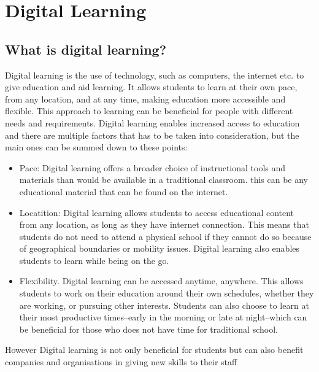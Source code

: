 \section{Digital Learning}\label{ch:digital_learning_ch}
\subsection{What is digital learning?}\label{ch:what_is_digital_learning}

Digital learning is the use of technology, such as computers, the internet etc. to give education and aid learning. It allows students to learn at their own pace, from any location, and at any time, making education more accessible and flexible. 
This approach to learning can be beneficial for people with different needs and requirements. Digital learning enables increased access to education and there are multiple factors that has to be taken into consideration, but the main ones can be summed down to these points\cite*{What_Is_Digital_Learning}:
\begin{itemize}
  \item   Pace:
	Digital learning offers a broader choice of instructional tools and materials than would be available in a traditional classroom. this can be any educational material that can be found on the internet.\cite*{What_Is_Digital_Learning}
  \item Locatition:
	  Digital learning allows students to access educational content from any location, as long as they have internet connection. This means that students do not need to attend a physical school if they cannot do so because of geographical boundaries or mobility issues. Digital learning also enables students to learn while being on the go.\cite*{What_Is_Digital_Learning}
  \item Flexibility. 
	Digital learning can be accessed anytime, anywhere. This allows students to work on their education around their own schedules, whether they are working, or pursuing other interests. Students can also choose to learn at their most productive times--early in the morning or late at night--which can be  beneficial for those who does not have time for traditional school.\cite*{What_Is_Digital_Learning}
\end{itemize}
However Digital learning is not only beneficial for students but can also benefit companies and organisations in giving new skills to their staff\cite*{Skills_Digital_Learning}


